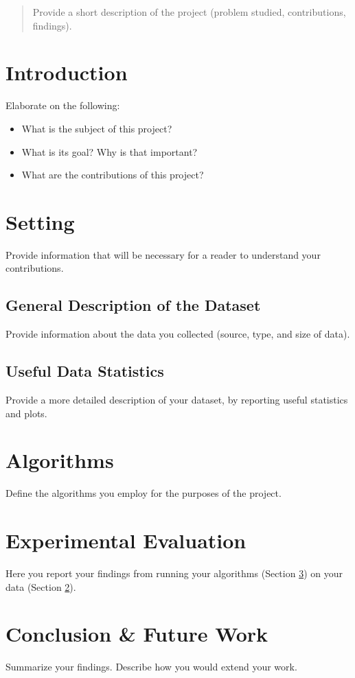 \begin{abstract}
Provide a short description of the project (problem studied, contributions, findings).
\end{abstract}

\section{Introduction}

Elaborate on the following:
\begin{itemize}
\item What is the subject of this project? 
\item What is its goal? Why is that important?
\item What are the contributions of this project?
\end{itemize}



\section{Setting}
\label{sec:setting}

Provide information that will be necessary for a reader to understand your contributions.

\subsection{General Description of the Dataset}

Provide information about the data you collected (source, type, and size of data).

\subsection{Useful Data Statistics}

Provide a more detailed description of your dataset, by reporting useful statistics and plots.

\section{Algorithms}
\label{sec:algorithms}

Define the algorithms you employ for the purposes of the project.

\section{Experimental Evaluation}

Here you report your findings from running your algorithms (Section \ref{sec:algorithms}) on your data (Section \ref{sec:setting}).

\section{Conclusion \& Future Work}

\balance
Summarize your findings. Describe how you would extend your work.




